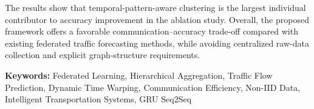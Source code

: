 The results show that temporal-pattern-aware clustering is the largest individual contributor to accuracy improvement in the ablation study. Overall, the proposed framework offers a favorable communication--accuracy trade-off compared with existing federated traffic forecasting methods, while avoiding centralized raw-data collection and explicit graph-structure requirements.

\vspace{1cm}
\noindent\textbf{Keywords:} Federated Learning, Hierarchical Aggregation, Traffic Flow Prediction, Dynamic Time Warping, Communication Efficiency, Non-IID Data, Intelligent Transportation Systems, GRU Seq2Seq